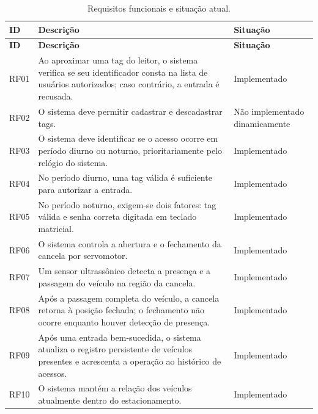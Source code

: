 \documentclass[11pt,a4paper]{article}
\begin{document}
\begin{longtable}{@{}p{1.3cm}L{9.5cm}p{3.3cm}@{}}
\caption{Requisitos funcionais e situação atual.}\label{tab:rf}\\
\toprule
\textbf{ID} & \textbf{Descrição} & \textbf{Situação} \\
\midrule
\endfirsthead
\toprule
\textbf{ID} & \textbf{Descrição} & \textbf{Situação} \\
\midrule
\endhead
\bottomrule
\endfoot

RF01 & Ao aproximar uma tag do leitor, o sistema verifica se seu identificador
consta na lista de usuários autorizados; caso contrário, a entrada é recusada.
& Implementado \\[4pt]

RF02 & O sistema deve permitir cadastrar e descadastrar tags.
& Não implementado dinamicamente \\[4pt]

RF03 & O sistema deve identificar se o acesso ocorre em período diurno ou
noturno, prioritariamente pelo relógio do sistema.
& Implementado \\[4pt]

RF04 & No período diurno, uma tag válida é suficiente para autorizar a entrada.
& Implementado \\[4pt]

RF05 & No período noturno, exigem-se dois fatores: tag válida e senha correta
digitada em teclado matricial.
& Implementado \\[4pt]

RF06 & O sistema controla a abertura e o fechamento da cancela por servomotor.
& Implementado \\[4pt]

RF07 & Um sensor ultrassônico detecta a presença e a passagem do veículo na
região da cancela.
& Implementado \\[4pt]

RF08 & Após a passagem completa do veículo, a cancela retorna à posição fechada;
o fechamento não ocorre enquanto houver detecção de presença.
& Implementado \\[4pt]

RF09 & Após uma entrada bem-sucedida, o sistema atualiza o registro persistente
de veículos presentes e acrescenta a operação ao histórico de acessos.
& Implementado \\[4pt]

RF10 & O sistema mantém a relação dos veículos atualmente dentro do
estacionamento.
& Implementado \\[4pt]


\end{longtable}
\end{document}
